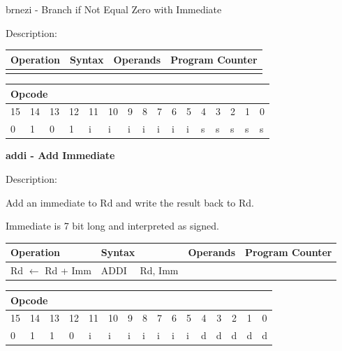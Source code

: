 \documentclass[%
	pdftex,
	a4paper,
	oneside,
	bibtotoc,%
	idxtotoc,%
	bibtotocnumbered,
	halfparskip,%
]{scrbook}
\begin{document}
\bigskip

brnezi - Branch if Not Equal Zero with Immediate

Description:

\begin{tabular}{|l|l|l|l|}
\hline
Operation & Syntax & Operands & Program Counter \\ \hline
&  &  &  \\ \hline
\end{tabular}

\begin{tabular}{|c|c|c|c|c|c|c|c|c|c|c|c|c|c|c|c|}
\hline
\multicolumn{6}{|l|}{Opcode} & \multicolumn{5}{|l|}{} & \multicolumn{5}{|l|}{
} \\ \hline
15 & 14 & 13 & 12 & 11 & 10 & 9 & 8 & 7 & 6 & 5 & 4 & 3 & 2 & 1 & 0 \\ \hline
\multicolumn{1}{|l|}{0} & \multicolumn{1}{|l|}{1} & \multicolumn{1}{|l|}{0}
& \multicolumn{1}{|l|}{1} & \multicolumn{1}{|l|}{i} & \multicolumn{1}{|l|}{i}
& \multicolumn{1}{|l|}{i} & \multicolumn{1}{|l|}{i} & \multicolumn{1}{|l|}{i}
& \multicolumn{1}{|l|}{i} & \multicolumn{1}{|l|}{i} & \multicolumn{1}{|l|}{s}
& \multicolumn{1}{|l|}{s} & \multicolumn{1}{|l|}{s} & \multicolumn{1}{|l|}{s}
& \multicolumn{1}{|l|}{s} \\ \hline
\end{tabular}

\bigskip

\textbf{addi - Add Immediate}

Description:

Add an immediate to Rd and write the result back to Rd.

Immediate is 7 bit long and interpreted as signed.

\begin{tabular}{|l|l|l|l|}
\hline
Operation & Syntax & Operands & Program Counter \\ \hline
Rd $\leftarrow $ Rd + Imm & ADDI \ \ Rd, Imm &  &  \\ \hline
\end{tabular}

\begin{tabular}{|c|c|c|c|c|c|c|c|c|c|c|c|c|c|c|c|}
\hline
\multicolumn{6}{|l|}{Opcode} & \multicolumn{5}{|l|}{} & \multicolumn{5}{|l|}{
} \\ \hline
15 & 14 & 13 & 12 & 11 & 10 & 9 & 8 & 7 & 6 & 5 & 4 & 3 & 2 & 1 & 0 \\ \hline
\multicolumn{1}{|l|}{0} & \multicolumn{1}{|l|}{1} & \multicolumn{1}{|l|}{1}
& \multicolumn{1}{|l|}{0} & \multicolumn{1}{|l|}{i} & \multicolumn{1}{|l|}{i}
& \multicolumn{1}{|l|}{i} & \multicolumn{1}{|l|}{i} & \multicolumn{1}{|l|}{i}
& \multicolumn{1}{|l|}{i} & \multicolumn{1}{|l|}{i} & \multicolumn{1}{|l|}{d}
& \multicolumn{1}{|l|}{d} & \multicolumn{1}{|l|}{d} & \multicolumn{1}{|l|}{d}
& \multicolumn{1}{|l|}{d} \\ \hline
\end{tabular}
\end{document}
